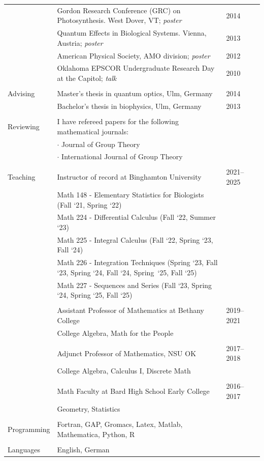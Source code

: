 \documentclass[letterpaper,12pt,oneside]{article}
\begin{document}
\begin{longtable}{p{0.15\linewidth}p{0.7\linewidth}p{0.15\linewidth}}
     & Gordon Research Conference (GRC) on Photosynthesis. West Dover, VT; \emph{poster} & 2014\\
     
    & Quantum Effects in Biological Systems. Vienna, Austria; \emph{poster} & 2013 \\
    
    & American Physical Society, AMO division; \emph{poster} & 2012\\
    
    & Oklahoma EPSCOR Undergraduate Research Day at the Capitol; \emph{talk} & 2010 \\ \\


 \large{Advising}    & Master's thesis in quantum optics, Ulm, Germany & 2014 \\
   & Bachelor's thesis in biophysics, Ulm, Germany & 2013 \\
     & & \\

 \large{Reviewing}    & I have refereed papers for the following mathematical journals: &\\
 & $\cdot$ Journal of Group Theory & \\
 & $\cdot$ International Journal of Group Theory & \\
     & & \\

\large{Teaching} & Instructor of record at Binghamton University & 2021--2025 \\
    & Math 148 - Elementary Statistics for Biologists (Fall `21, Spring `22) \\
    & Math 224 - Differential Calculus (Fall `22, Summer `23) \\
    & Math 225 - Integral Calculus (Fall `22, Spring `23, Fall `24) \\
    & Math 226 - Integration Techniques (Spring `23, Fall `23, Spring `24, Fall `24, Spring~`25, Fall `25) \\
    & Math 227 - Sequences and Series (Fall `23, Spring `24, Spring `25, Fall `25)   \\
    &&\\
    &Assistant Professor of Mathematics at Bethany College & 2019--2021 \\
    & College Algebra, Math for the People\\
    &&\\
    &Adjunct Professor of Mathematics, NSU OK & 2017--2018 \\
    & College Algebra, Calculus I, Discrete Math \\
    &&\\
    &Math Faculty at Bard High School Early College & 2016--2017 \\
    & Geometry, Statistics \\&&\\
    
    \large{Programming}   & Fortran, GAP, Gromacs, Latex, Matlab, Mathematica, Python, R \\ &&\\

    \large{Languages}  & English, German

\end{longtable}
\end{document}
